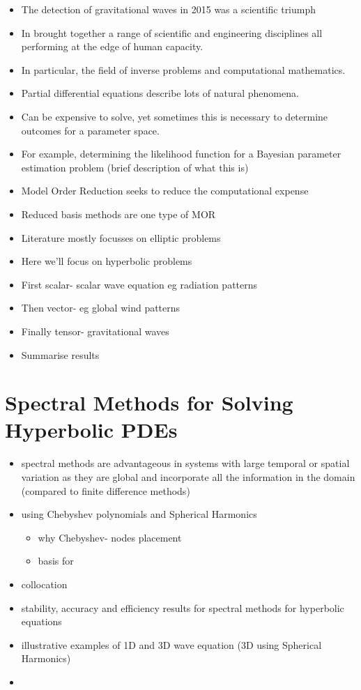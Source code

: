 \begin{itemize}
\item The detection of gravitational waves in 2015 was a scientific triumph
\item In brought together a range of scientific and engineering disciplines all performing at the edge of human capacity. 
\item In particular, the field of inverse problems and computational mathematics. 
\item Partial differential equations describe lots of natural phenomena. 
\item Can be expensive to solve, yet sometimes this is necessary to determine outcomes for a parameter space.
\item For example, determining the likelihood function for a Bayesian parameter estimation problem (brief description of what this is)
\item Model Order Reduction seeks to reduce the computational expense
\item Reduced basis methods are one type of MOR
\item Literature mostly focusses on elliptic problems
\item Here we'll focus on hyperbolic problems
\item First scalar- scalar wave equation eg radiation patterns
\item Then vector- eg global wind patterns
\item Finally tensor- gravitational waves
\item Summarise results
\end{itemize}



\chapter{Spectral Methods for Solving Hyperbolic PDEs}
\begin{itemize}
\item spectral methods are advantageous in systems with large temporal or spatial variation as they are global and incorporate all the information in the domain (compared to finite difference methods)
\item using Chebyshev polynomials and Spherical Harmonics
\begin{itemize}
\item why Chebyshev- nodes placement
\item basis for
\end{itemize}
\item collocation
\item stability, accuracy and efficiency results for spectral methods for hyperbolic equations
\item illustrative examples of 1D and 3D wave equation (3D using Spherical Harmonics)
\item 
\end{itemize}



